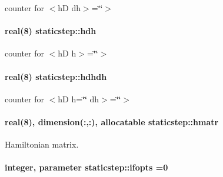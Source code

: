 counter for $<$h\+D dh$>$=\char`\"{}\char`\"{}$>$ 

\paragraph[{\texorpdfstring{hdh}{hdh}}]{\setlength{\rightskip}{0pt plus 5cm}real(8) staticstep\+::hdh\hspace{0.3cm}{\ttfamily [private]}}\hypertarget{namespacestaticstep_a356065bb46b188687661cc58f93d058d}{}\label{namespacestaticstep_a356065bb46b188687661cc58f93d058d}


counter for $<$h\+D h$>$=\char`\"{}\char`\"{}$>$ 

\paragraph[{\texorpdfstring{hdhdh}{hdhdh}}]{\setlength{\rightskip}{0pt plus 5cm}real(8) staticstep\+::hdhdh\hspace{0.3cm}{\ttfamily [private]}}\hypertarget{namespacestaticstep_aa7f31f9f91a7710115dc3b41e204a17a}{}\label{namespacestaticstep_aa7f31f9f91a7710115dc3b41e204a17a}


counter for $<$h\+D h=\char`\"{}\char`\"{} dh$>$=\char`\"{}\char`\"{}$>$ 

\paragraph[{\texorpdfstring{hmatr}{hmatr}}]{\setlength{\rightskip}{0pt plus 5cm}real(8), dimension(\+:,\+:), allocatable staticstep\+::hmatr\hspace{0.3cm}{\ttfamily [private]}}\hypertarget{namespacestaticstep_a929a7dc3c5e6260892e06030be3db7af}{}\label{namespacestaticstep_a929a7dc3c5e6260892e06030be3db7af}


Hamiltonian matrix. 

\paragraph[{\texorpdfstring{ifopts}{ifopts}}]{\setlength{\rightskip}{0pt plus 5cm}integer, parameter staticstep\+::ifopts =0\hspace{0.3cm}{\ttfamily [private]}}\hypertarget{namespacestaticstep_a6234332d57c0353da44fba6dd923ebf2}{}\label{namespacestaticstep_a6234332d57c0353da44fba6dd923ebf2}


